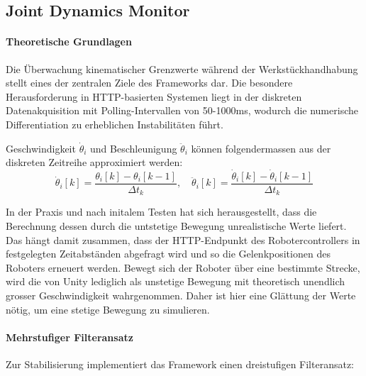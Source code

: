 \subsection{Joint Dynamics Monitor}
\label{sssec:joint_dynamics_monitor}

\paragraph{Theoretische Grundlagen} Die Überwachung kinematischer Grenzwerte
während der Werkstückhandhabung stellt eines der zentralen Ziele des Frameworks dar. Die besondere Herausforderung in HTTP-basierten Systemen
liegt in der diskreten Datenakquisition mit Polling-Intervallen von 50-1000ms,
wodurch die numerische Differentiation zu erheblichen Instabilitäten
führt.

Geschwindigkeit $\dot{\theta}_i$ und Beschleunigung $\ddot{\theta}_i$ können folgendermassen aus der diskreten Zeitreihe approximiert werden:
\begin{equation}
	\dot{\theta}_i[k] = \frac{\theta_i[k] - \theta_i[k-1]}{\Delta t_k}, \quad
	\ddot{\theta}_i[k] = \frac{\dot{\theta}_i[k] - \dot{\theta}_i[k-1]}{\Delta t_k}
	\label{eq:discrete_derivatives}
\end{equation}

In der Praxis und nach initalem Testen hat sich herausgestellt, dass die
Berechnung dessen durch die untstetige Bewegung unrealistische Werte liefert.
Das hängt damit zusammen, dass der HTTP-Endpunkt des Robotercontrollers in
festgelegten Zeitabständen abgefragt wird und so die Gelenkpositionen des
Roboters erneuert werden. Bewegt sich der Roboter über eine bestimmte Strecke,
wird die von Unity lediglich als unstetige Bewegung mit theoretisch unendlich
grosser Geschwindigkeit wahrgenommen. Daher ist hier eine Glättung der Werte
nötig, um eine stetige Bewegung zu simulieren.

\paragraph{Mehrstufiger Filteransatz}
Zur Stabilisierung implementiert das Framework einen dreistufigen Filteransatz:

